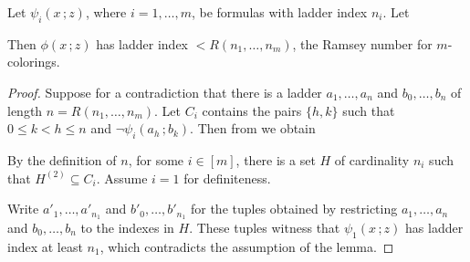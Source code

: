 \documentclass[scombinatorics.tex]{subfiles}
\begin{document}
\begin{lemma}
  Let $\psi_i(x\,;z)$, where $i=1,\dots,m$, be formulas with ladder index $n_i$. Let
  
  
  Then $\phi(x\,;z)$ has ladder index $<R(n_1,\dots, n_m)$, the Ramsey number for $m$-colorings.
\end{lemma}
  
\begin{proof} 
  Suppose for a contradiction that there is a ladder $a_1,\dots,a_n$ and $b_0,\dots,b_n$ of length $n=R(n_1,\dots, n_m)$.
  Let $C_i$ contains the pairs $\{h,k\}$ such that $0\le k<h\le n$ and $\neg\psi_i(a_h\,;b_k)$.
  Then from  we obtain 
  
  
  By the definition of $n$, for some $i\in[m]$, there is a set $H$ of cardinality $n_i$ such that $H^{(2)}\subseteq C_i$.
  Assume $i{=}1$ for definiteness.

  Write $a'_1,\dots,a'_{n_1}$ and $b'_0,\dots,b'_{n_1}$ for the tuples obtained by restricting $a_1,\dots,a_n$ and $b_0,\dots,b_n$ to the indexes in $H$.
  These tuples witness that $\psi_1(x\,;z)$ has ladder index at least $n_1$, which contradicts the assumption of the lemma.
\end{proof}
  
\end{document}
